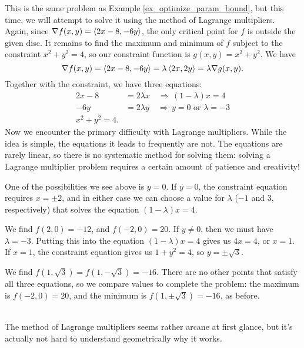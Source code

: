 {
This is the same problem as Example \ref{ex_optimize_param_bound}, but this time, we will attempt to solve it using the method of Lagrange multipliers. Again, since $\nabla f(x,y) = \left\langle 2x-8,-6y\right\rangle$, the only critical point for $f$ is outside the given disc. It remains to find the maximum and minimum of $f$ subject to the constraint $x^2+y^2=4$, so our constraint function is $g(x,y)=x^2+y^2$. We have
\[
\nabla f(x,y) = \left\langle 2x-8, -6y\right\rangle = \lambda \left\langle 2x,2y\right\rangle = \lambda\nabla g(x,y).
\]
Together with  the constraint, we have three equations:
\begin{align*}
2x-8 & = 2\lambda x \quad \Rightarrow\, (1-\lambda)x=4\\
-6y & = 2\lambda y \quad \Rightarrow\, y=0 \text{ or } \lambda = -3\\
x^2+y^2=4.
\end{align*}
Now we encounter the primary difficulty with Lagrange multipliers. While the idea is simple, the equations it leads to frequently are not. The equations are rarely linear, so there is no systematic method for solving them: solving a Lagrange multiplier problem requires a certain amount of patience and creativity!

One of the possibilities we see above is $y=0$. If $y=0$, the constraint equation requires $x=\pm 2$, and in either case we can choose a value for $\lambda$ ($-1$ and $3$, respectively) that solves the equation $(1-\lambda)x=4$.

We find $f(2,0)=-12$, and $f(-2,0)=20$. If $y\neq 0$, then we must have $\lambda=-3$. Putting this into the equation $(1-\lambda)x=4$ gives us $4x=4$, or $x=1$. If $x=1$, the constraint equation gives us $1+y^2=4$, so $y=\pm \sqrt{3}$.

We find $f(1,\sqrt{3})=f(1,-\sqrt{3}) = -16$. There are no other points that satisfy all three equations, so we compare values to complete the problem: the maximum is $f(-2,0)=20$, and the minimum is $f(1,\pm\sqrt{3})=-16$, as before.
}\\

The method of Lagrange multipliers seems rather arcane at first glance, but it's actually not hard to understand geometrically why it works.


